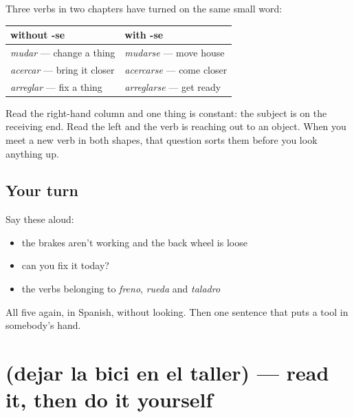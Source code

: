\begin{grammarlens}[title={Grammar Lens: the -se you keep meeting}]
Three verbs in two chapters have turned on the same small word:

\noindent
\begin{tabularx}{\linewidth}{@{}>{\raggedright\arraybackslash}X>{\raggedright\arraybackslash}X@{}}
\toprule
\textbf{without -se} & \textbf{with -se} \\
\midrule
\emph{mudar} — change a thing & \emph{mudarse} — move house \\
\emph{acercar} — bring it closer & \emph{acercarse} — come closer \\
\emph{arreglar} — fix a thing & \emph{arreglarse} — get ready \\
\bottomrule
\end{tabularx}

Read the right-hand column and one thing is constant: the subject is on the receiving end. Read the left and the verb is reaching out to an object. When you meet a new verb in both shapes, that question sorts them before you look anything up.
\end{grammarlens}

\subsection*{Your turn}
Say these aloud:

\begin{itemize}
\raggedright
  \item the brakes aren't working and the back wheel is loose
  \item can you fix it today?
  \item the verbs belonging to \emph{freno}, \emph{rueda} and \emph{taladro}
\end{itemize}

\begin{tcolorbox}[breakable,colback=teal!4,colframe=teal!35!black,title={Before you move on}]
All five again, in Spanish, without looking. Then one sentence that puts a tool in somebody's hand.
\end{tcolorbox}
\section[Practice]{(dejar la bici en el taller) — read it, then do it yourself}

\label{lesson:ES-C449-sintesis-taller}



